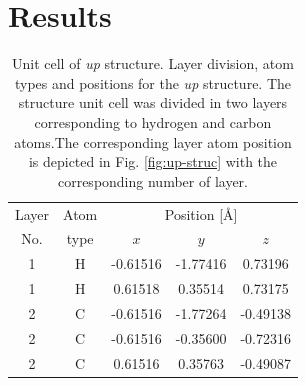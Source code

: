 \documentclass[prb,11pt,tightenlines,twocolumn,aps]{revtex4-1}
\begin{document}

\section{Results} %
\label{sec:results}

\begin{table}[t]
\center
\begin{tabular}{ccccc}\\
\hline
\quad Layer \quad & \quad Atom \qquad & \multicolumn{3}{c}{Position [\AA]} \\
\cline{3-5}
\quad No.   \quad & \quad type \qquad & $x$ & $y$ & $z$  \\
\hline
1 & H & -0.61516 & -1.77416 &  0.73196 \\
1 & H &  0.61518 &  0.35514 &  0.73175 \\
2 & C & -0.61516 & -1.77264 & -0.49138 \\
2 & C & -0.61516 & -0.35600 & -0.72316 \\
2 & C &  0.61516 &  0.35763 & -0.49087 \\
\hline
\end{tabular}

\caption{Unit cell of \emph{up} structure. Layer division, atom types and
positions for the \emph{up} structure. The structure unit cell was divided in
two layers corresponding to hydrogen and carbon atoms.The corresponding layer
atom position is depicted in Fig. \ref{fig:up-struc} with the corresponding
number of layer.}
\label{tab:up-unitcell}
\end{table}
% 
% 
\end{document}
